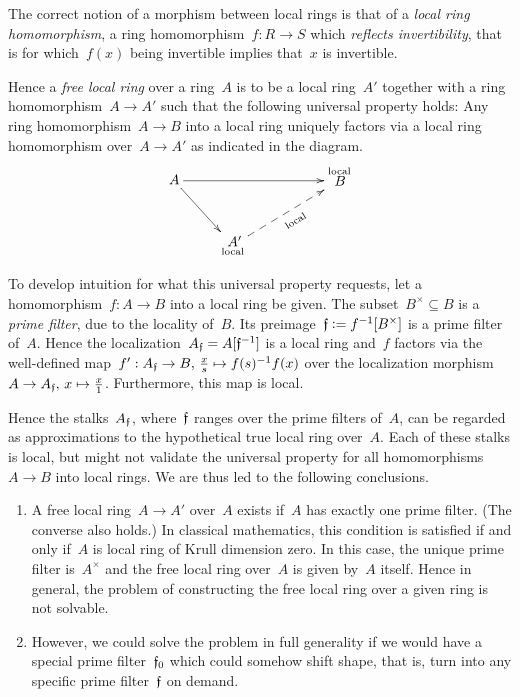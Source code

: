 \documentclass{ws-rv9x6}
\begin{document}
{The correct notion of a morphism between local rings is that of a \emph{local
ring homomorphism}, a ring homomorphism~$f : R \to S$ which \emph{reflects
invertibility}, that is for which~$f(x)$ being invertible implies that~$x$ is
invertible.

Hence a \emph{free local ring} over a ring~$A$ is to be a local ring~$A'$
together with a ring homomorphism~$A \to A'$ such that the following universal
property holds: Any ring homomorphism~$A \to B$ into a local ring uniquely
factors via a local ring homomorphism over~$A \to A'$ as indicated in the diagram.
\[ \xymatrix{
  A \ar[rd] \ar[rrr] &&& {\substack{\text{local}\\\text{\normalsize$\!\!\!B$}\\\phantom{\text{local}}}} \\
  & {\substack{\text{\normalsize$\!\!A'$}\\\text{local}}} \ar@{-->}_[@!31]{\text{local}}[rru]
} \]

To develop intuition for what this universal property requests, let a
homomorphism~$f : A \to B$ into a local ring be given. The subset~$B^\times
\subseteq B$ is a \emph{prime filter}, due to the locality of~$B$. Its
preimage~$\mathfrak{f} \vcentcolon= f^{-1}[B^\times]$ is a prime filter of~$A$. Hence the
localization~$A_{\mathfrak{f}} = A[\mathfrak{f}^{-1}]$ is a local ring and~$f$ factors via the
well-defined map~$f' : A_{\mathfrak{f}} \to B,\,\frac{x}{s} \mapsto f(s)^{-1}f(x)$ over
the localization morphism~$A \to A_{\mathfrak{f}},\,x \mapsto \frac{x}{1}$. Furthermore,
this map is local.

Hence the stalks~$A_{\mathfrak{f}}$, where~$\mathfrak{f}$ ranges over the prime filters of~$A$,
can be regarded as approximations to the hypothetical true local ring over~$A$.
Each of these stalks is local, but might not validate the universal property
for all homomorphisms~$A \to B$ into local rings. We are thus led to the
following conclusions.

\begin{enumerate}
\item A free local ring~$A \to A'$ over~$A$ exists if~$A$ has exactly one prime
filter. (The converse also holds.) In classical mathematics, this condition is
satisfied if and only if~$A$ is local ring of Krull dimension zero. In this
case, the unique prime filter is~$A^\times$ and the free local ring over~$A$ is given
by~$A$ itself. Hence in general, the problem of constructing the free local
ring over a given ring is not solvable.
\item However, we could solve the problem in full generality if we would have a
special prime filter~$\mathfrak{f}_0$ which could somehow shift shape, that is, turn into any
specific prime filter~$\mathfrak{f}$ on demand.
\end{enumerate}

}
\end{document}
